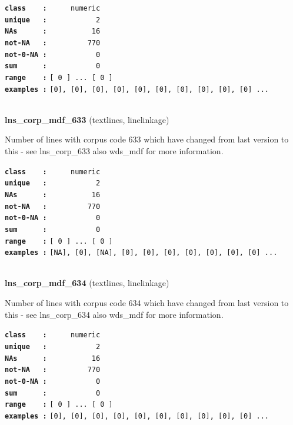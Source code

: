 \documentclass[]{article}
\begin{document}
\textbf{\texttt{class\ \ \ \ :}} \texttt{~~~~~numeric}\\
\textbf{\texttt{unique\ \ \ :}} \texttt{~~~~~~~~~~~2}\\
\textbf{\texttt{NAs\ \ \ \ \ \ :}} \texttt{~~~~~~~~~~16}\\
\textbf{\texttt{not-NA\ \ \ :}} \texttt{~~~~~~~~~770}\\
\textbf{\texttt{not-0-NA\ :}} \texttt{~~~~~~~~~~~0}\\
\textbf{\texttt{sum\ \ \ \ \ \ :}} \texttt{~~~~~~~~~~~0}\\
\textbf{\texttt{range\ \ \ \ :}}
\texttt{{[}\ 0\ {]}\ ...\ {[}\ 0\ {]}}\\
\textbf{\texttt{examples\ :}}
\texttt{{[}0{]},\ {[}0{]},\ {[}0{]},\ {[}0{]},\ {[}0{]},\ {[}0{]},\ {[}0{]},\ {[}0{]},\ {[}0{]},\ {[}0{]}\ ...}\\

~

\textbf{lns\_corp\_mdf\_633} (textlines, linelinkage)

Number of lines with corpus code 633 which have changed from last
version to this - see lns\_corp\_633 also wds\_mdf for more information.

\textbf{\texttt{class\ \ \ \ :}} \texttt{~~~~~numeric}\\
\textbf{\texttt{unique\ \ \ :}} \texttt{~~~~~~~~~~~2}\\
\textbf{\texttt{NAs\ \ \ \ \ \ :}} \texttt{~~~~~~~~~~16}\\
\textbf{\texttt{not-NA\ \ \ :}} \texttt{~~~~~~~~~770}\\
\textbf{\texttt{not-0-NA\ :}} \texttt{~~~~~~~~~~~0}\\
\textbf{\texttt{sum\ \ \ \ \ \ :}} \texttt{~~~~~~~~~~~0}\\
\textbf{\texttt{range\ \ \ \ :}}
\texttt{{[}\ 0\ {]}\ ...\ {[}\ 0\ {]}}\\
\textbf{\texttt{examples\ :}}
\texttt{{[}NA{]},\ {[}0{]},\ {[}NA{]},\ {[}0{]},\ {[}0{]},\ {[}0{]},\ {[}0{]},\ {[}0{]},\ {[}0{]},\ {[}0{]}\ ...}\\

~

\textbf{lns\_corp\_mdf\_634} (textlines, linelinkage)

Number of lines with corpus code 634 which have changed from last
version to this - see lns\_corp\_634 also wds\_mdf for more information.

\textbf{\texttt{class\ \ \ \ :}} \texttt{~~~~~numeric}\\
\textbf{\texttt{unique\ \ \ :}} \texttt{~~~~~~~~~~~2}\\
\textbf{\texttt{NAs\ \ \ \ \ \ :}} \texttt{~~~~~~~~~~16}\\
\textbf{\texttt{not-NA\ \ \ :}} \texttt{~~~~~~~~~770}\\
\textbf{\texttt{not-0-NA\ :}} \texttt{~~~~~~~~~~~0}\\
\textbf{\texttt{sum\ \ \ \ \ \ :}} \texttt{~~~~~~~~~~~0}\\
\textbf{\texttt{range\ \ \ \ :}}
\texttt{{[}\ 0\ {]}\ ...\ {[}\ 0\ {]}}\\
\textbf{\texttt{examples\ :}}
\texttt{{[}0{]},\ {[}0{]},\ {[}0{]},\ {[}0{]},\ {[}0{]},\ {[}0{]},\ {[}0{]},\ {[}0{]},\ {[}0{]},\ {[}0{]}\ ...}\\
\end{document}
